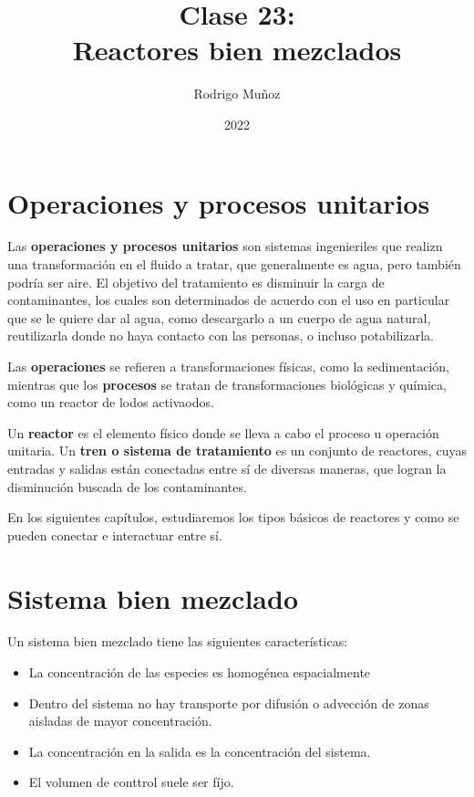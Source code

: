 \documentclass[11pt]{article}
\title{Clase 23: \\ Reactores bien mezclados}
\author{Rodrigo Muñoz}
\date{2022}
\begin{document}
\maketitle

\section{Operaciones y procesos unitarios}

Las \textbf{operaciones y procesos unitarios} son sistemas ingenieriles que realizn una transformación en el fluido a tratar, que generalmente es agua, pero también podría ser aire. El objetivo del tratamiento es disminuir la carga de contaminantes, los cuales son determinados de acuerdo con el uso en particular que se le quiere dar al agua, como descargarlo a un cuerpo de agua natural, reutilizarla donde no haya contacto con las personas, o incluso potabilizarla.

Las \textbf{operaciones} se refieren a transformaciones físicas, como la sedimentación, mientras que los \textbf{procesos} se tratan de transformaciones biológicas y química, como un reactor de lodos activaodos.

Un \textbf{reactor} es el elemento físico donde se lleva a cabo el proceso u operación unitaria. Un \textbf{tren o sistema de tratamiento} es un conjunto de reactores, cuyas entradas y salidas están conectadas entre sí de diversas maneras, que logran la disminución buscada de los contaminantes.

En los siguientes capítulos, estudiaremos los tipos básicos de reactores y como se pueden conectar e interactuar entre sí.

\section{Sistema bien mezclado}

Un sistema bien mezclado tiene las siguientes características:

\begin{itemize}
    \item La concentración de las especies es homogénea espacialmente
    \item Dentro del sistema no hay transporte por difusión o advección de zonas aisladas de mayor concentración.
    \item La concentración en la salida es la concentración del sistema.
    \item El volumen de conttrol suele ser fíjo.
\end{itemize}
\end{document}
